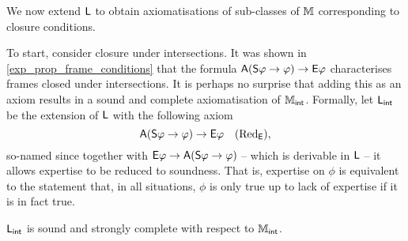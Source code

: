 We now extend $\mathsf{L}$ to obtain axiomatisations of sub-classes of $\mathbb{M}$
corresponding to closure conditions.

To start, consider closure under intersections. It was shown in
\cref{exp_prop_frame_conditions} that the formula $\mathsf{A}(\mathsf{S}\varphi \to
\varphi) \to \mathsf{E}\varphi$ characterises frames closed under intersections. It is
perhaps no surprise that adding this as an axiom results in a sound and
complete axiomatisation of $\mathbb{M}_{\mathsf{int}}$. Formally, let $\mathsf{L}_{\mathsf{int}}$ be the
extension of $\mathsf{L}$ with the following axiom
\[
    \mathsf{A}(\mathsf{S}\varphi \to \varphi) \to \mathsf{E}\varphi \quad (\text{Red}_{\mathsf{E}}),
\]
so-named since together with $\mathsf{E}\varphi \to \mathsf{A}(\mathsf{S}\varphi \to \varphi)$
-- which is derivable in $\mathsf{L}$ -- it allows expertise to be reduced
to soundness. That is, expertise on $\phi$ is equivalent to the statement that,
in all situations, $\phi$ is only true up to lack of expertise if it is in fact
true.

\begin{theorem}
\label{exp_thm_mint_axiomatisation}
$\mathsf{L}_{\mathsf{int}}$ is sound and strongly complete with respect to
$\mathbb{M}_{\mathsf{int}}$.
\end{theorem}

